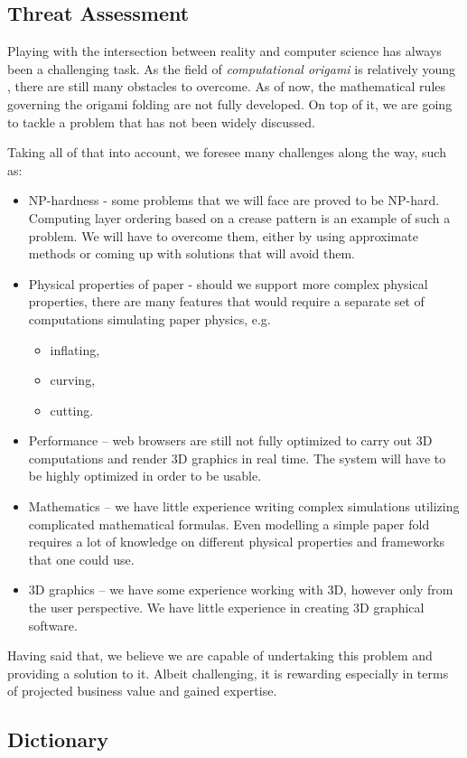\subsection{Threat Assessment}

Playing with the intersection between reality and computer science has always been a challenging task.
As the field of \textit{computational origami} is relatively young \cite{recent-results-in-computational-origami:paper}, there are still many obstacles to overcome.
As of now, the mathematical rules governing the origami folding are not fully developed.
On top of it, we are going to tackle a problem that has not been widely discussed.

Taking all of that into account, we foresee many challenges along the way, such as:

\begin{itemize}
	\item NP-hardness - some problems that we will face are proved to be NP-hard.
		Computing layer ordering based on a crease pattern is an example of such a problem.
		We will have to overcome them, either by using approximate methods or coming up with solutions that will avoid them.

	\item Physical properties of paper - should we support more complex physical properties,
		there are many features that would require a separate set of computations simulating paper physics, e.g.
		\begin{itemize}
			\item inflating,
			\item curving,
			\item cutting.
		\end{itemize}

	\item Performance -- web browsers are still not fully optimized to carry out 3D computations and render 3D graphics in real time.
		The system will have to be highly optimized in order to be usable.
		
	\item Mathematics -- we have little experience writing complex simulations utilizing complicated mathematical formulas.
		Even modelling a simple paper fold requires a lot of knowledge on different physical properties and frameworks that one could use.

	\item 3D graphics -- we have some experience working with 3D, however only from the user perspective.
		We have little experience in creating 3D graphical software.

\end{itemize}

Having said that, we believe we are capable of undertaking this problem and providing a solution to it.
Albeit challenging, it is rewarding especially in terms of projected business value and gained expertise.

\subsection{Dictionary}\label{dictionary}



